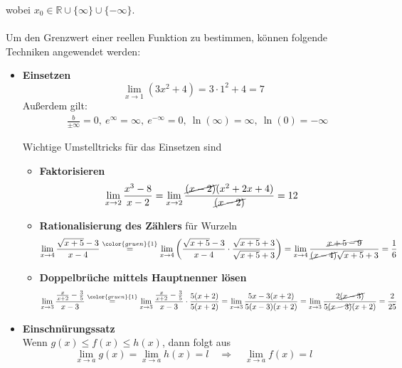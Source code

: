 \documentclass{article}
\newcommand{\lr}[1]{\left(#1\right)}
\newcommand{\commentmath}[1]{{\color{gruen}{#1}}}
\begin{document}
wobei $x_0\in \mathbb{R} \cup \{\infty\} \cup \{-\infty\}$.\\
\\
Um den Grenzwert einer reellen Funktion zu bestimmen, können folgende Techniken angewendet werden:
\begin{itemize}
	\item \textbf{Einsetzen}
	{\color{blue}
		$$\lim\limits_{x\rightarrow 1} (3x^2 + 4) = 3\cdot 1^2 + 4 = 7$$
	}
	Außerdem gilt: 
		\begin{align}
			&\frac{b}{\pm\infty} = 0,\ e^\infty = \infty,\ e^{-\infty} = 0,\ \ln(\infty) = \infty,\ \ln(0) = -\infty
		\end{align}
	
	Wichtige Umstelltricks für das Einsetzen sind
	\begin{itemize}
		\item \textbf{Faktorisieren}
			$$\lim\limits_{x\rightarrow 2} \frac{x^3 - 8}{x - 2} = \lim\limits_{x\rightarrow 2} \frac{\cancel{(x - 2)}(x^2 + 2x + 4)}{\cancel{(x - 2)}} = 12$$
		\item \textbf{Rationalisierung des Zählers} für Wurzeln
			$$\lim\limits_{x\rightarrow 4} \frac{\sqrt{x + 5} - 3}{x - 4} \stackrel{\commentmath{1}}{=} \lim\limits_{x\rightarrow 4} \lr{\frac{\sqrt{x + 5} - 3}{x - 4} \cdot \frac{\sqrt{x + 5} + 3}{\sqrt{x + 5} + 3}} = \lim\limits_{x\rightarrow 4} \frac{\cancel{x + 5 - 9}}{\cancel{(x - 4)}\sqrt{x + 5} + 3} = \frac{1}{6}$$
			
		\item \textbf{Doppelbrüche mittels Hauptnenner lösen} 
			$$\lim\limits_{x\rightarrow 3} \frac{\frac{x}{x + 2} - \frac{3}{5}}{x - 3} \stackrel{\commentmath{1}}{=} \lim\limits_{x\rightarrow 3} \frac{\frac{x}{x + 2} - \frac{3}{5}}{x - 3} \cdot \frac{5(x+2)}{5(x+2)} = \lim\limits_{x\rightarrow 3} \frac{5x - 3(x + 2)}{5(x - 3)(x + 2)} = \lim\limits_{x\rightarrow 3} \frac{2 \cancel{(x-3)}}{5\cancel{(x - 3)}(x + 2)} = \frac{2}{25}$$
	\end{itemize}


	\item \textbf{Einschnürungssatz}\\
	Wenn $g(x) \leq f(x) \leq h(x)$, dann folgt aus 
		\begin{equation}
			\lim\limits_{x\rightarrow a} g(x) = \lim\limits_{x\rightarrow a} h(x) = l \quad\Rightarrow\quad \lim\limits_{x\rightarrow a} f(x) = l
		\end{equation}
		


\end{itemize}
\end{document}
